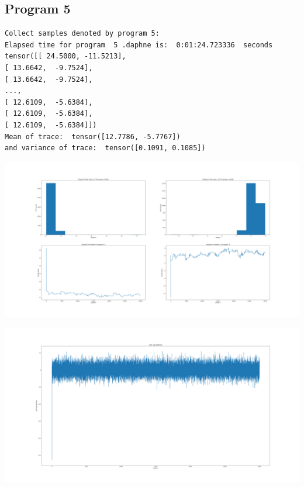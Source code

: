 \documentclass[]{article}
\begin{document}
\subsection{Program 5}
\begin{verbatim}
Collect samples denoted by program 5:
Elapsed time for program  5 .daphne is:  0:01:24.723336  seconds
tensor([[ 24.5000, -11.5213],
[ 13.6642,  -9.7524],
[ 13.6642,  -9.7524],
...,
[ 12.6109,  -5.6384],
[ 12.6109,  -5.6384],
[ 12.6109,  -5.6384]])
Mean of trace:  tensor([12.7786, -5.7767])  
and variance of trace:  tensor([0.1091, 0.1085])
\end{verbatim}
\begin{center}
	\includegraphics[width=\linewidth]{Figures/p5_MHGibbs.png}
\end{center}
\begin{center}
	\includegraphics[width=\linewidth]{Figures/p5_MHGibbsjll.png}
\end{center}
\end{document}
